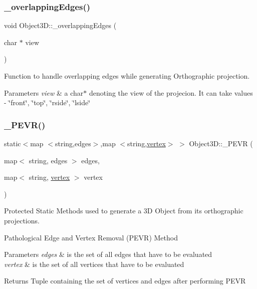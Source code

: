 \subsubsection{\texorpdfstring{\+\_\+overlapping\+Edges()}{\_overlappingEdges()}}
{\footnotesize\ttfamily void Object3\+D\+::\+\_\+overlapping\+Edges (\begin{DoxyParamCaption}\item[{char $\ast$}]{view }\end{DoxyParamCaption})\hspace{0.3cm}{\ttfamily [protected]}}

Function to handle overlapping edges while generating Orthographic projection. 
\begin{DoxyParams}{Parameters}
{\em view} & a char$\ast$ denoting the view of the projecion. It can take values -\/ \char`\"{}front\char`\"{}, \char`\"{}top\char`\"{}, \char`\"{}rside\char`\"{}, \char`\"{}lside\char`\"{} \\
\hline
\end{DoxyParams}
\mbox{\label{class_object3_d_acc47b9e290622539909a31f75b491961}} 
\subsubsection{\texorpdfstring{\+\_\+\+P\+E\+V\+R()}{\_PEVR()}}
{\footnotesize\ttfamily static$<$map $<$string,edges$>$,map $<$string,\mbox{\hyperlink{structvertex}{vertex}}$>$ $>$ Object3\+D\+::\+\_\+\+P\+E\+VR (\begin{DoxyParamCaption}\item[{map$<$ string, edges $>$}]{edges,  }\item[{map$<$ string, \mbox{\hyperlink{structvertex}{vertex}} $>$}]{vertex }\end{DoxyParamCaption})\hspace{0.3cm}{\ttfamily [protected]}}



Protected Static Methods used to generate a 3D Object from its orthographic projections. 

Pathological Edge and Vertex Removal (P\+E\+VR) Method 
\begin{DoxyParams}{Parameters}
{\em edges} & is the set of all edges that have to be evaluated \\
\hline
{\em vertex} & is the set of all vertices that have to be evaluated \\
\hline
\end{DoxyParams}
\begin{DoxyReturn}{Returns}
Tuple containing the set of vertices and edges after performing P\+E\+VR 
\end{DoxyReturn}
\mbox{\label{class_object3_d_a4ba10d710ee36ae12a341adfda9b9631}} 
